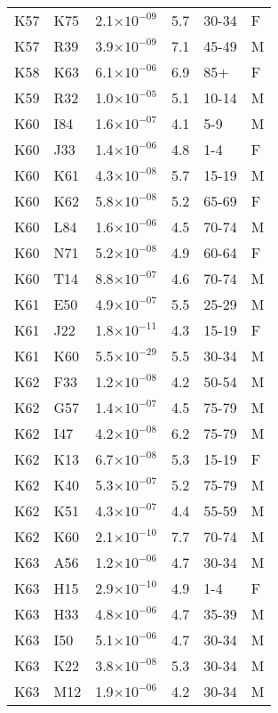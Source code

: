 \begin{longtable}{lllrll}
   K57 & K75 & 2.1$\times10^{-09}$ & 5.7 & 30-34 & F \\ 
   K57 & R39 & 3.9$\times10^{-09}$ & 7.1 & 45-49 & M \\ 
   K58 & K63 & 6.1$\times10^{-06}$ & 6.9 & 85+ & F \\ 
   K59 & R32 & 1.0$\times10^{-05}$ & 5.1 & 10-14 & M \\ 
   K60 & I84 & 1.6$\times10^{-07}$ & 4.1 & 5-9 & M \\ 
   K60 & J33 & 1.4$\times10^{-06}$ & 4.8 & 1-4 & F \\ 
   K60 & K61 & 4.3$\times10^{-08}$ & 5.7 & 15-19 & M \\ 
   K60 & K62 & 5.8$\times10^{-08}$ & 5.2 & 65-69 & F \\ 
   K60 & L84 & 1.6$\times10^{-06}$ & 4.5 & 70-74 & M \\ 
   K60 & N71 & 5.2$\times10^{-08}$ & 4.9 & 60-64 & F \\ 
   K60 & T14 & 8.8$\times10^{-07}$ & 4.6 & 70-74 & M \\ 
   K61 & E50 & 4.9$\times10^{-07}$ & 5.5 & 25-29 & M \\ 
   K61 & J22 & 1.8$\times10^{-11}$ & 4.3 & 15-19 & F \\ 
   K61 & K60 & 5.5$\times10^{-29}$ & 5.5 & 30-34 & M \\ 
   K62 & F33 & 1.2$\times10^{-08}$ & 4.2 & 50-54 & M \\ 
   K62 & G57 & 1.4$\times10^{-07}$ & 4.5 & 75-79 & M \\ 
   K62 & I47 & 4.2$\times10^{-08}$ & 6.2 & 75-79 & M \\ 
   K62 & K13 & 6.7$\times10^{-08}$ & 5.3 & 15-19 & F \\ 
   K62 & K40 & 5.3$\times10^{-07}$ & 5.2 & 75-79 & M \\ 
   K62 & K51 & 4.3$\times10^{-07}$ & 4.4 & 55-59 & M \\ 
   K62 & K60 & 2.1$\times10^{-10}$ & 7.7 & 70-74 & M \\ 
   K63 & A56 & 1.2$\times10^{-06}$ & 4.7 & 30-34 & M \\ 
   K63 & H15 & 2.9$\times10^{-10}$ & 4.9 & 1-4 & F \\ 
   K63 & H33 & 4.8$\times10^{-06}$ & 4.7 & 35-39 & M \\ 
   K63 & I50 & 5.1$\times10^{-06}$ & 4.7 & 30-34 & M \\ 
   K63 & K22 & 3.8$\times10^{-08}$ & 5.3 & 30-34 & M \\ 
   K63 & M12 & 1.9$\times10^{-06}$ & 4.2 & 30-34 & M \\ 

\end{longtable}
